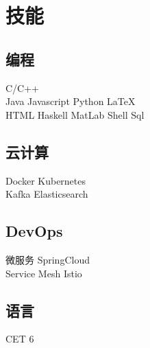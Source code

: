 \documentclass[]{deedy-resume-openfont}
\begin{document}
\begin{minipage}[t]{0.25\textwidth}

\section{技能}
\sectionsep
\subsection{编程}
C/C++ \\
Java \textbullet{} Javascript \textbullet{} Python \textbullet{} LaTeX\ \\
HTML \textbullet{} Haskell \textbullet{} MatLab \textbullet{} Shell \textbullet{} Sql \\ 
\sectionsep

\subsection{云计算}
Docker \textbullet{} Kubernetes \\
Kafka \textbullet{} Elasticsearch \\
\sectionsep

\subsection{DevOps}
微服务 \textbullet{} SpringCloud \\
Service Mesh \textbullet{} Istio  \\
\sectionsep

\subsection{语言}
CET 6   \\
\sectionsep

%
%

\end{minipage} 
\hfill
\end{document}
